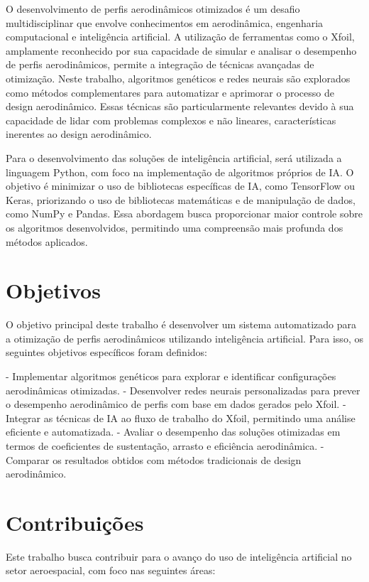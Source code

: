 O desenvolvimento de perfis aerodinâmicos otimizados é um desafio multidisciplinar que envolve conhecimentos em aerodinâmica, engenharia computacional e inteligência artificial. A utilização de ferramentas como o Xfoil, amplamente reconhecido por sua capacidade de simular e analisar o desempenho de perfis aerodinâmicos, permite a integração de técnicas avançadas de otimização. Neste trabalho, algoritmos genéticos e redes neurais são explorados como métodos complementares para automatizar e aprimorar o processo de design aerodinâmico. Essas técnicas são particularmente relevantes devido à sua capacidade de lidar com problemas complexos e não lineares, características inerentes ao design aerodinâmico. 

Para o desenvolvimento das soluções de inteligência artificial, será utilizada a linguagem Python, com foco na implementação de algoritmos próprios de IA. O objetivo é minimizar o uso de bibliotecas específicas de IA, como TensorFlow ou Keras, priorizando o uso de bibliotecas matemáticas e de manipulação de dados, como NumPy e Pandas. Essa abordagem busca proporcionar maior controle sobre os algoritmos desenvolvidos, permitindo uma compreensão mais profunda dos métodos aplicados.

\section{Objetivos}

O objetivo principal deste trabalho é desenvolver um sistema automatizado para a otimização de perfis aerodinâmicos utilizando inteligência artificial. Para isso, os seguintes objetivos específicos foram definidos:

- Implementar algoritmos genéticos para explorar e identificar configurações aerodinâmicas otimizadas.
- Desenvolver redes neurais personalizadas para prever o desempenho aerodinâmico de perfis com base em dados gerados pelo Xfoil.
- Integrar as técnicas de IA ao fluxo de trabalho do Xfoil, permitindo uma análise eficiente e automatizada.
- Avaliar o desempenho das soluções otimizadas em termos de coeficientes de sustentação, arrasto e eficiência aerodinâmica.
- Comparar os resultados obtidos com métodos tradicionais de design aerodinâmico.

\section{Contribuições}

Este trabalho busca contribuir para o avanço do uso de inteligência artificial no setor aeroespacial, com foco nas seguintes áreas:

